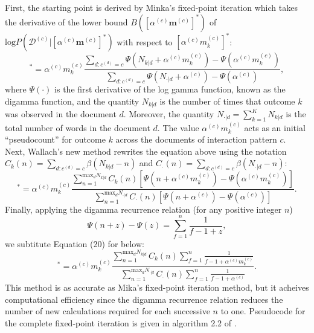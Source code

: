 \documentclass[a4paper]{article}
\begin{document}
 \newline First, the starting point is derived by Minka’s fixed-point iteration which takes the derivative of the lower bound $B([\alpha^{(c)}\boldsymbol{m}^{(c)}]^*)$ of $\mbox{log}P(\mathcal{D}^{(c)}|[\alpha^{(c)}\boldsymbol{m}^{(c)}]^*)$ with respect to $[\alpha^{(c)} {m^{(c)}_k}]^*$:
 \begin{equation}
 [\alpha^{(c)} m^{(c)}_k]^*=\alpha^{(c)} m^{(c)}_k\frac{\sum_{d:c^{(d)}=c}\Psi(N_{k|d}+\alpha^{(c)} m^{(c)}_k)-\Psi(\alpha^{(c)} m^{(c)}_k)}{\sum_{d:c^{(d)}=c}\Psi(N_{\cdot|d}+\alpha^{(c)})-\Psi(\alpha^{(c)})},
 \end{equation}
 where $\Psi(\cdot)$ is the first derivative of the log gamma function, known as the digamma function, and the quantity $N_{k|d}$ is the number of times that outcome $k$ was observed in the document $d$. Moreover, the quantity $N_{\cdot|d}=\sum_{k=1}^K N_{k|d}$ is the total number of words in the document $d$. The
 value $\alpha^{(c)} m^{(c)}_k$ acts as an initial “pseudocount” for outcome $k$ across the documents of interaction pattern $c$.\\ \newline
 Next, Wallach's new method rewrites the equation above using the notation $C_k(n)=\sum\limits_{d:c^{(d)}=c}\beta(N_{k|d}-n)$ and $C_\cdot(n)=\sum\limits_{d:c^{(d)}=c}\beta(N_{\cdot|d}-n)$:
 \begin{equation}
 [\alpha^{(c)} m^{(c)}_k]^*=\alpha^{(c)} m^{(c)}_k\frac{\sum_{n=1}^{\mbox{max}_dN_{k|d}}C_k(n)[\Psi(n+\alpha^{(c)} m^{(c)}_k)-\Psi(\alpha^{(c)} m^{(c)}_k)]}{\sum_{n=1}^{\mbox{max}_dN_{\cdot|d}}C_\cdot(n)[\Psi(n+\alpha^{(c)})-\Psi(\alpha^{(c)})]}.
 \end{equation}
 Finally, applying the digamma recurrence relation (for any positive integer $n$) $$\Psi(n+z)-\Psi(z)=\sum_{f=1}^{n}\frac{1}{f-1+z},$$ we subtitute Equation (20) for below:
 \begin{equation}
 [\alpha^{(c)} m^{(c)}_k]^*=\alpha^{(c)} m^{(c)}_k\frac{\sum_{n=1}^{\mbox{max}_dN_{k|d}}C_k(n)\sum_{f=1}^n \frac{1}{f-1+\alpha^{(c)} m^{(c)}_k}}{\sum_{n=1}^{\mbox{max}_dN_{\cdot|d}}C_\cdot(n)\sum_{f=1}^n \frac{1}{f-1+\alpha^{(c)}}}.
 \end{equation}
 This method is as accurate as Mika's fixed-point iteration method, but it acheives computational efficiency since the digamma recurrence relation reduces the number of new calculations required for each successive $n$ to one. Pseudocode
 for the complete fixed-point iteration is given in algorithm 2.2 of \cite{wallach2008structured}.
 \clearpage
\end{document}
